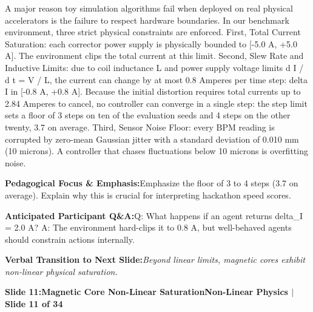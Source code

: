 \documentclass[11pt,a4paper]{article}
\begin{document}
\begin{tcolorbox}[colback=white,colframe=primaryblue,title={\footnotesize\bfseries\color{white}Spoken Presenter Script},fontupper=\small,left=6pt,right=6pt,top=3pt,bottom=3pt,boxrule=0.8pt,arc=2.5pt]
A major reason toy simulation algorithms fail when deployed on real physical accelerators is the failure to respect hardware boundaries. In our benchmark environment, three strict physical constraints are enforced. First, Total Current Saturation: each corrector power supply is physically bounded to [-5.0 A, +5.0 A]. The environment clips the total current at this limit. Second, Slew Rate and Inductive Limits: due to coil inductance L and power supply voltage limits d I / d t = V / L, the current can change by at most 0.8 Amperes per time step: delta I in [-0.8 A, +0.8 A]. Because the initial distortion requires total currents up to 2.84 Amperes to cancel, no controller can converge in a single step: the step limit sets a floor of 3 steps on ten of the evaluation seeds and 4 steps on the other twenty, 3.7 on average. Third, Sensor Noise Floor: every BPM reading is corrupted by zero-mean Gaussian jitter with a standard deviation of 0.010 mm (10 microns). A controller that chases fluctuations below 10 microns is overfitting noise.
\end{tcolorbox}
\vspace{0.2em}
\begin{tcolorbox}[colback=lightbg,colframe=bordergray,left=6pt,right=6pt,top=3pt,bottom=3pt,boxrule=0.6pt,arc=2.5pt]
\small
\noindent\textbf{\color{navy}Pedagogical Focus \& Emphasis:}\enspace Emphasize the floor of 3 to 4 steps (3.7 on average). Explain why this is crucial for interpreting hackathon speed scores.\par\vspace{0.3em}
\noindent\textbf{\color{successgreen}Anticipated Participant Q\&A:}\enspace Q: What happens if an agent returns delta\_I = 2.0 A? A: The environment hard-clips it to 0.8 A, but well-behaved agents should constrain actions internally.\par\vspace{0.3em}
\noindent\textbf{\color{accent}Verbal Transition to Next Slide:}\enspace \emph{Beyond linear limits, magnetic cores exhibit non-linear physical saturation.}
\end{tcolorbox}
\clearpage
\hypertarget{slide.11}{}
{}
\noindent\begin{tcolorbox}[colback=navy,colframe=navy,left=6pt,right=6pt,top=3pt,bottom=3pt,boxrule=0pt,arc=2pt]
{\large\bfseries\color{white}Slide 11:\enspace Magnetic Core Non-Linear Saturation}\hfill{\footnotesize\bfseries\color{white!85!lightbg}Non-Linear Physics \enspace$|$\enspace Slide 11 of 34}
\end{tcolorbox}
\end{document}
